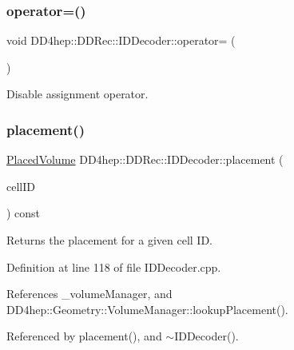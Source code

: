 \subsubsection{\texorpdfstring{operator=()}{operator=()}}
{\footnotesize\ttfamily void D\+D4hep\+::\+D\+D\+Rec\+::\+I\+D\+Decoder\+::operator= (\begin{DoxyParamCaption}\item[{const \hyperlink{class_d_d4hep_1_1_d_d_rec_1_1_i_d_decoder}{I\+D\+Decoder} \&}]{ }\end{DoxyParamCaption})\hspace{0.3cm}{\ttfamily [private]}}



Disable assignment operator. 

\hypertarget{class_d_d4hep_1_1_d_d_rec_1_1_i_d_decoder_ab806215c7006028504ae0cfdef1e90d2}{}\label{class_d_d4hep_1_1_d_d_rec_1_1_i_d_decoder_ab806215c7006028504ae0cfdef1e90d2} 
\subsubsection{\texorpdfstring{placement()}{placement()}\hspace{0.1cm}{\footnotesize\ttfamily [1/2]}}
{\footnotesize\ttfamily \hyperlink{class_d_d4hep_1_1_geometry_1_1_placed_volume}{Placed\+Volume} D\+D4hep\+::\+D\+D\+Rec\+::\+I\+D\+Decoder\+::placement (\begin{DoxyParamCaption}\item[{const \hyperlink{namespace_d_d4hep_1_1_d_d_rec_af5cecc2e566eeaedb430b92df23971d4}{Cell\+ID} \&}]{cell\+ID }\end{DoxyParamCaption}) const}



Returns the placement for a given cell ID. 



Definition at line 118 of file I\+D\+Decoder.\+cpp.



References \+\_\+volume\+Manager, and D\+D4hep\+::\+Geometry\+::\+Volume\+Manager\+::lookup\+Placement().



Referenced by placement(), and $\sim$\+I\+D\+Decoder().

\hypertarget{class_d_d4hep_1_1_d_d_rec_1_1_i_d_decoder_a8c54faa66d19d5774e1ec0764f3bc723}{}\label{class_d_d4hep_1_1_d_d_rec_1_1_i_d_decoder_a8c54faa66d19d5774e1ec0764f3bc723} 
